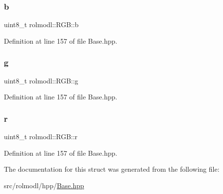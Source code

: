 \subsubsection{\texorpdfstring{b}{b}}
{\footnotesize\ttfamily uint8\+\_\+t rolmodl\+::\+R\+G\+B\+::b}



Definition at line 157 of file Base.\+hpp.

\mbox{\label{structrolmodl_1_1_r_g_b_ad1916c33b016a51d1af7b181a269ed6c}} 
\subsubsection{\texorpdfstring{g}{g}}
{\footnotesize\ttfamily uint8\+\_\+t rolmodl\+::\+R\+G\+B\+::g}



Definition at line 157 of file Base.\+hpp.

\mbox{\label{structrolmodl_1_1_r_g_b_a188c62cc17e0f6739c10e4d5ce6ae785}} 
\subsubsection{\texorpdfstring{r}{r}}
{\footnotesize\ttfamily uint8\+\_\+t rolmodl\+::\+R\+G\+B\+::r}



Definition at line 157 of file Base.\+hpp.



The documentation for this struct was generated from the following file\+:\begin{DoxyCompactItemize}
\item 
src/rolmodl/hpp/\mbox{\hyperlink{_base_8hpp}{Base.\+hpp}}\end{DoxyCompactItemize}
